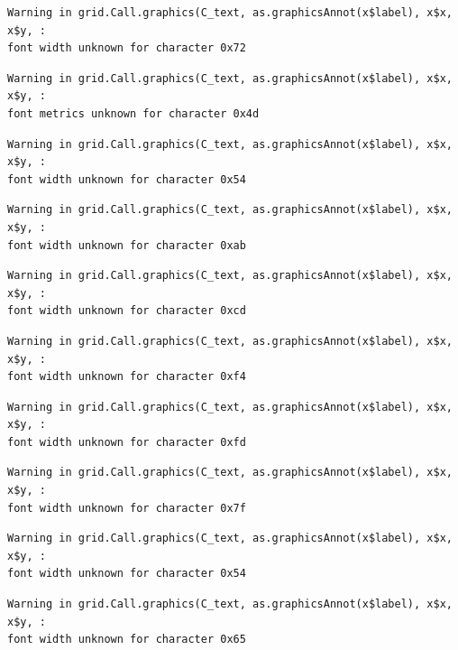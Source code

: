 \documentclass[
  letterpaper,
  DIV=11,
  numbers=noendperiod]{scrreprt}
\begin{document}
\begin{verbatim}
Warning in grid.Call.graphics(C_text, as.graphicsAnnot(x$label), x$x, x$y, :
font width unknown for character 0x72
\end{verbatim}

\begin{verbatim}
Warning in grid.Call.graphics(C_text, as.graphicsAnnot(x$label), x$x, x$y, :
font metrics unknown for character 0x4d
\end{verbatim}

\begin{verbatim}
Warning in grid.Call.graphics(C_text, as.graphicsAnnot(x$label), x$x, x$y, :
font width unknown for character 0x54
\end{verbatim}

\begin{verbatim}
Warning in grid.Call.graphics(C_text, as.graphicsAnnot(x$label), x$x, x$y, :
font width unknown for character 0xab
\end{verbatim}

\begin{verbatim}
Warning in grid.Call.graphics(C_text, as.graphicsAnnot(x$label), x$x, x$y, :
font width unknown for character 0xcd
\end{verbatim}

\begin{verbatim}
Warning in grid.Call.graphics(C_text, as.graphicsAnnot(x$label), x$x, x$y, :
font width unknown for character 0xf4
\end{verbatim}

\begin{verbatim}
Warning in grid.Call.graphics(C_text, as.graphicsAnnot(x$label), x$x, x$y, :
font width unknown for character 0xfd
\end{verbatim}

\begin{verbatim}
Warning in grid.Call.graphics(C_text, as.graphicsAnnot(x$label), x$x, x$y, :
font width unknown for character 0x7f
\end{verbatim}

\begin{verbatim}
Warning in grid.Call.graphics(C_text, as.graphicsAnnot(x$label), x$x, x$y, :
font width unknown for character 0x54
\end{verbatim}

\begin{verbatim}
Warning in grid.Call.graphics(C_text, as.graphicsAnnot(x$label), x$x, x$y, :
font width unknown for character 0x65
\end{verbatim}
\end{document}
